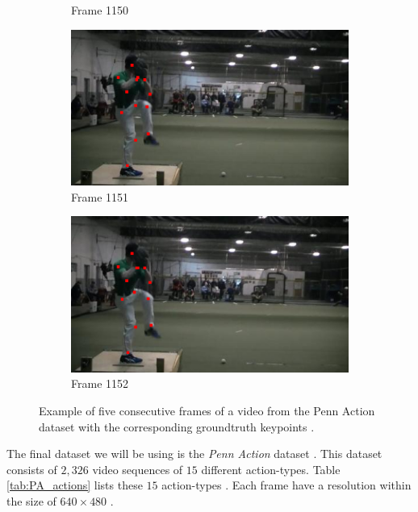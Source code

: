 \documentclass[./main.tex]{subfiles}
\begin{document}
\begin{figure}[htbp]
\begin{subfigure}{0.45\textwidth}
        \caption{Frame 1150}
    \end{subfigure}
    \begin{subfigure}{0.45\textwidth}
        \centering
        \includegraphics[width=\textwidth]{entities/PA_63.png}
        \caption{Frame 1151}
    \end{subfigure}
    \begin{subfigure}{0.45\textwidth}
        \centering
        \includegraphics[width=\textwidth]{entities/PA_64.png}
        \caption{Frame 1152}
    \end{subfigure}
    \caption{Example of five consecutive frames of a video from the Penn Action dataset with the corresponding groundtruth keypoints \cite{penn_action}.}
    \label{fig:PA_dataset}
\end{figure}
The final dataset we will be using is the \textit{Penn Action} dataset \cite{penn_action}. This dataset consists of $2,326$ video sequences of $15$ different action-types. Table \ref{tab:PA_actions} lists these $15$ action-types \cite{penn_action}. Each frame have a resolution within the size of $640 \times 480$ \cite{penn_action}.
\\
\end{document}

